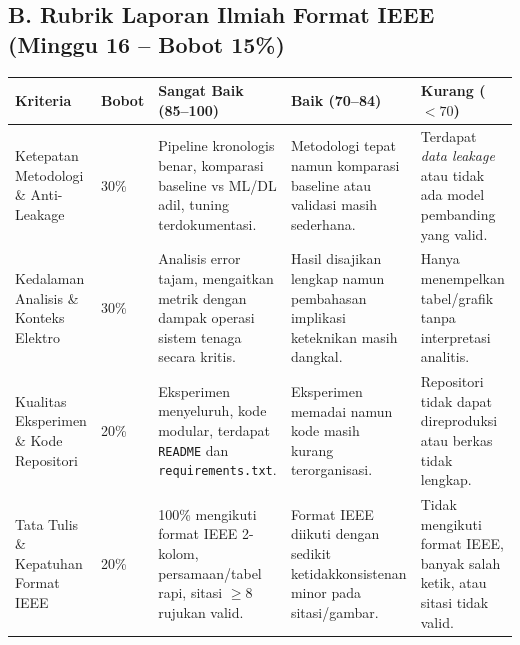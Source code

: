\documentclass[11pt,a4paper]{article}
\newcommand{\hdr}[1]{\cellcolor{headerrow}\color{white}\textbf{#1}}
\begin{document}
\subsection{B. Rubrik Laporan Ilmiah Format IEEE (Minggu 16 -- Bobot 15\%)}
{\footnotesize
\setlength{\tabcolsep}{4pt}
\begin{tabular}{|p{3.0cm}|p{0.9cm}|p{3.8cm}|p{3.8cm}|p{3.5cm}|}
\hline
\hdr{Kriteria} & \hdr{Bobot} & \hdr{Sangat Baik (85--100)} & \hdr{Baik (70--84)} & \hdr{Kurang ($<70$)} \\ \hline
Ketepatan Metodologi \& Anti-Leakage & 30\% & Pipeline kronologis benar, komparasi baseline vs ML/DL adil, tuning terdokumentasi. & Metodologi tepat namun komparasi baseline atau validasi masih sederhana. & Terdapat \textit{data leakage} atau tidak ada model pembanding yang valid. \\ \hline
Kedalaman Analisis \& Konteks Elektro & 30\% & Analisis error tajam, mengaitkan metrik dengan dampak operasi sistem tenaga secara kritis. & Hasil disajikan lengkap namun pembahasan implikasi keteknikan masih dangkal. & Hanya menempelkan tabel/grafik tanpa interpretasi analitis. \\ \hline
Kualitas Eksperimen \& Kode Repositori & 20\% & Eksperimen menyeluruh, kode modular, terdapat \texttt{README} dan \texttt{requirements.txt}. & Eksperimen memadai namun kode masih kurang terorganisasi. & Repositori tidak dapat direproduksi atau berkas tidak lengkap. \\ \hline
Tata Tulis \& Kepatuhan Format IEEE & 20\% & 100\% mengikuti format IEEE 2-kolom, persamaan/tabel rapi, sitasi $\ge 8$ rujukan valid. & Format IEEE diikuti dengan sedikit ketidakkonsistenan minor pada sitasi/gambar. & Tidak mengikuti format IEEE, banyak salah ketik, atau sitasi tidak valid. \\ \hline
\end{tabular}
}
\end{document}
